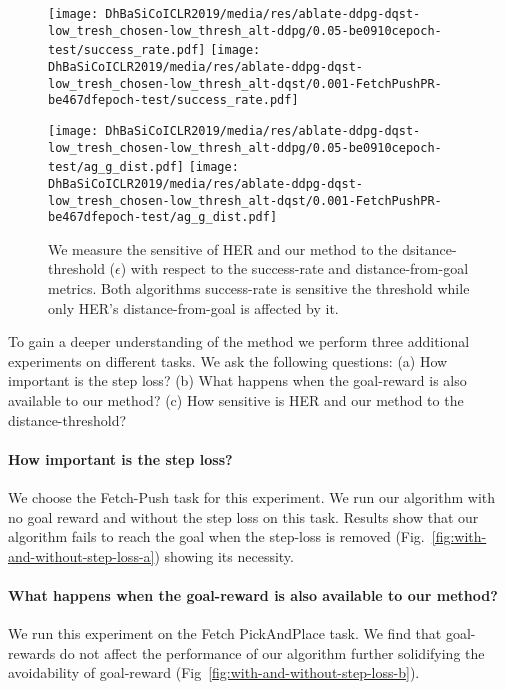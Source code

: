 %
\begin{figure}%
  \def\frac{0.5}
\begin{minipage}[b]{\frac\linewidth}\centering
  \texttt{[image: DhBaSiCoICLR2019/media/res/ablate-ddpg-dqst-low\_tresh\_chosen-low\_thresh\_alt-ddpg/0.05-be0910cepoch-test/success\_rate.pdf]}%
  \texttt{[image: DhBaSiCoICLR2019/media/res/ablate-ddpg-dqst-low\_tresh\_chosen-low\_thresh\_alt-dqst/0.001-FetchPushPR-be467dfepoch-test/success\_rate.pdf]}%
  \label{fig:success-rate}
  \end{minipage}\begin{minipage}[b]{\frac\linewidth}\centering
  \texttt{[image: DhBaSiCoICLR2019/media/res/ablate-ddpg-dqst-low\_tresh\_chosen-low\_thresh\_alt-ddpg/0.05-be0910cepoch-test/ag\_g\_dist.pdf]}%
  \texttt{[image: DhBaSiCoICLR2019/media/res/ablate-ddpg-dqst-low\_tresh\_chosen-low\_thresh\_alt-dqst/0.001-FetchPushPR-be467dfepoch-test/ag\_g\_dist.pdf]}%
  \label{fig:distance}
\end{minipage}
  \caption{We measure the sensitive of HER and our method to the
    dsitance-threshold ($\epsilon$) with respect to the success-rate
    and distance-from-goal metrics. Both algorithms success-rate is
    sensitive the threshold while only HER's distance-from-goal is
    affected by it. 
}%
  \label{fig:with-different-distance-thresholds}%
\end{figure}%
% 

To gain a deeper understanding of the method we perform three additional
experiments on different tasks. We ask the following questions:
(a) How important is the step loss?
(b) What happens when the goal-reward is also available to our method?
(c) How sensitive is HER and our method to the distance-threshold?
\paragraph{How important is the step loss?}
%
We choose the Fetch-Push task for this experiment.
We run our algorithm with no goal reward and without the step loss on
this task. Results show that our algorithm fails to reach the goal when the
step-loss is removed (Fig.~\ref{fig:with-and-without-step-loss-a})
showing its necessity.

\paragraph{What happens when the goal-reward is also available to our method?}
We run this experiment on the Fetch PickAndPlace task. We find that
goal-rewards do not affect the performance of our algorithm further
solidifying the avoidability of goal-reward
(Fig~\ref{fig:with-and-without-step-loss-b}).

